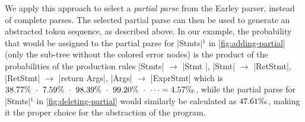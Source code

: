 

We apply this approach to select a \emph{partial parse} from the Earley parser,
instead of complete parses. The selected partial parse can then be used to
generate an abstracted token sequence, as described above. In our example, the
probability that would be assigned to the partial parse for |Stmts|$^1$ in
\autoref{fig:adding-partial} (only the sub-tree without the colored error nodes)
is the product of the probabilities of the production rules |Stmts|
$\rightarrow$ |Stmt \n|, |Stmt| $\rightarrow$ |RetStmt|, |RetStmt| $\rightarrow$
|return Args|, |Args| $\rightarrow$ |ExprStmt| \etc which is $38.77\%\ \cdot\
7.59\%\ \cdot\ 98.39\%\ \cdot\ 99.20\%\ \cdot\ \dots =
4.57\text{\textperthousand}$, while the partial parse for |Stmts|$^1$ in
\autoref{fig:deleting-partial} would similarly be calculated as
$47.61\text{\textperthousand}$, making it the proper choice for the abstraction
of the program.


